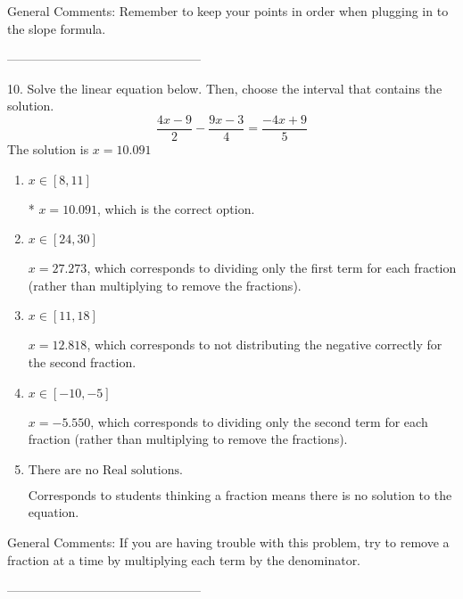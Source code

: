 \documentclass{extbook}[14pt]
\begin{document}
General Comments: Remember to keep your points in order when plugging in to the slope formula.

-----------------------------------------------

10. Solve the linear equation below. Then, choose the interval that contains the solution.
\[ \frac{4 x - 9}{2} - \frac{9 x - 3}{4} = \frac{-4 x + 9}{5} \] 
The solution is $ x = 10.091 $ 

\begin{enumerate}[label=\Alph*.] 
\item $ x \in [8, 11] $ 

 * $x = 10.091$, which is the correct option. 
\item $ x \in [24, 30] $ 

  $x = 27.273$, which corresponds to dividing only the first term for each fraction (rather than multiplying to remove the fractions). 
\item $ x \in [11, 18] $ 

  $x = 12.818$, which corresponds to not distributing the negative correctly for the second fraction. 
\item $ x \in [-10, -5] $ 

  $x = -5.550$, which corresponds to dividing only the second term for each fraction (rather than multiplying to remove the fractions). 
\item $ \text{There are no Real solutions.} $ 

 Corresponds to students thinking a fraction means there is no solution to the equation. 
\end{enumerate} 
 
General Comments: If you are having trouble with this problem, try to remove a fraction at a time by multiplying each term by the denominator.

-----------------------------------------------
\end{document}

